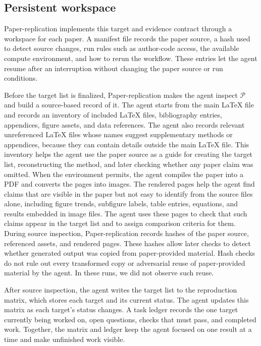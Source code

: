 \documentclass[authoryear,5p,times,nopreprintline]{elsarticle}
\begin{document}
\subsection{Persistent workspace}\label{sec:persistent_workflow}
Paper-replication implements this target and evidence contract through a workspace for each paper.
A manifest file records the paper source, a hash used to detect source changes, run rules such as author-code access, the available compute environment, and how to rerun the workflow.
These entries let the agent resume after an interruption without changing the paper source or run conditions.

Before the target list is finalized, Paper-replication makes the agent inspect \(\mathcal{P}\) and build a source-based record of it.
The agent starts from the main \LaTeX{} file and records an inventory of included \LaTeX{} files, bibliography entries, appendices, figure assets, and data references.
The agent also records relevant unreferenced \LaTeX{} files whose names suggest supplementary methods or appendices, because they can contain details outside the main \LaTeX{} file.
This inventory helps the agent use the paper source as a guide for creating the target list, reconstructing the method, and later checking whether any paper claim was omitted.
When the environment permits, the agent compiles the paper into a PDF and converts the pages into images.
The rendered pages help the agent find claims that are visible in the paper but not easy to identify from the source files alone, including figure trends, subfigure labels, table entries, equations, and results embedded in image files.
The agent uses these pages to check that such claims appear in the target list and to assign comparison criteria for them.
During source inspection, Paper-replication records hashes of the paper source, referenced assets, and rendered pages.
These hashes allow later checks to detect whether generated output was copied from paper-provided material.
Hash checks do not rule out every transformed copy or adversarial reuse of paper-provided material by the agent.
In these runs, we did not observe such reuse.

After source inspection, the agent writes the target list to the reproduction matrix, which stores each target and its current status.
The agent updates this matrix as each target's status changes.
A task ledger records the one target currently being worked on, open questions, checks that must pass, and completed work.
Together, the matrix and ledger keep the agent focused on one result at a time and make unfinished work visible.
\end{document}
